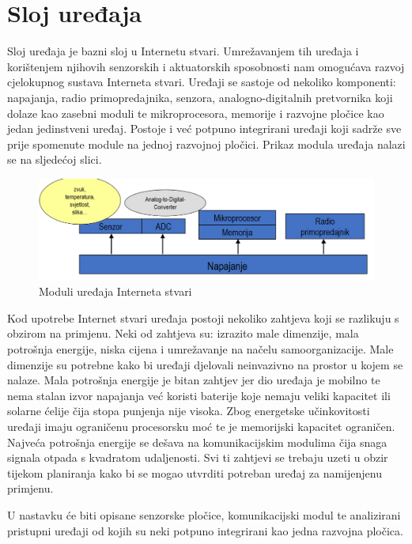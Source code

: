 \documentclass[times, utf8, diplomski]{fer}
\begin{document}
\section{Sloj uređaja}
Sloj uređaja je bazni sloj u Internetu stvari. Umrežavanjem tih uređaja i korištenjem njihovih senzorskih i aktuatorskih sposobnosti nam omogućava razvoj cjelokupnog sustava Interneta stvari. Uređaji se sastoje od nekoliko komponenti: napajanja, radio primopredajnika, senzora, analogno-digitalnih pretvornika koji dolaze kao zasebni moduli te mikroprocesora, memorije i razvojne pločice kao jedan jedinstveni uređaj. Postoje i već potpuno integrirani uređaji koji sadrže sve prije spomenute module na jednoj razvojnoj pločici. Prikaz modula uređaja nalazi se na sljedećoj slici.
\begin{figure}[htb]
    \centering
    \includegraphics[width=14cm]{images/devicemodule.png}
    \caption{Moduli uređaja Interneta stvari\citep{InternetStvari}}
    \label{fig:devicemodule}
\end{figure}

Kod upotrebe Internet stvari uređaja postoji nekoliko zahtjeva koji se razlikuju s obzirom na primjenu. Neki od zahtjeva su: izrazito male dimenzije, mala potrošnja energije, niska cijena i umrežavanje na načelu samoorganizacije. Male dimenzije su potrebne kako bi uređaji djelovali neinvazivno na prostor u kojem se nalaze. Mala potrošnja energije je bitan zahtjev jer dio uređaja je mobilno te nema stalan izvor napajanja već koristi baterije koje nemaju veliki kapacitet ili solarne ćelije čija stopa punjenja nije visoka. Zbog energetske učinkovitosti uređaji imaju ograničenu procesorsku moć te je memorijski kapacitet ograničen. Najveća potrošnja energije se dešava na komunikacijskim modulima čija snaga signala otpada s kvadratom udaljenosti. Svi ti zahtjevi se trebaju uzeti u obzir tijekom planiranja kako bi se mogao utvrditi potreban uređaj za namijenjenu primjenu.

U nastavku će biti opisane senzorske pločice, komunikacijski modul te analizirani pristupni uređaji od kojih su neki potpuno integrirani kao jedna razvojna pločica.
\end{document}
